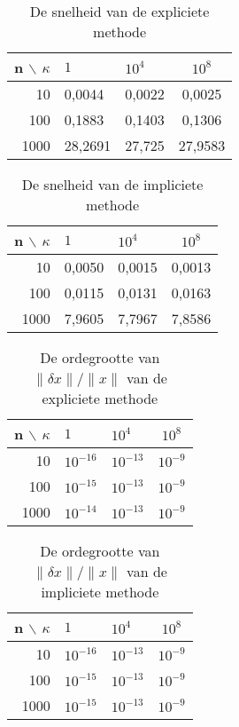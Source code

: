 \begin{table}[H]
\begin{center}
\begin{tabular}{r|llc}
n $\backslash$ $\kappa$ & $1$ & $10^4$ & $10^8$ \\\hline
10 & 0,0044 & 0,0022 & 0,0025 \\
100 & 0,1883 & 0,1403 & 0,1306 \\
1000 & 28,2691 & 27,725 & 27,9583
\end{tabular}
\end{center}
\caption{De snelheid van de expliciete methode}
\label{snelheid_exp}
\end{table}

\begin{table}[H]
\begin{center}
\begin{tabular}{r|llc}
n $\backslash$ $\kappa$ & $1$ & $10^4$ & $10^8$ \\\hline
10 & 0,0050 & 0,0015 & 0,0013 \\
100 & 0,0115 & 0,0131 & 0,0163 \\
1000 & 7,9605 & 7,7967 & 7,8586
\end{tabular}
\end{center}
\caption{De snelheid van de impliciete methode}
\label{snelheid_imp}
\end{table}

\begin{table}[H]
\begin{center}
\begin{tabular}{r|llc}
n $\backslash$ $\kappa$ & $1$ & $10^4$ & $10^8$ \\\hline
10 & $10^{-16}$ & $10^{-13}$ & $10^{-9}$ \\
100 & $10^{-15}$ & $10^{-13}$ & $10^{-9}$ \\
1000 & $10^{-14}$ & $10^{-13}$ & $10^{-9}$
\end{tabular}
\end{center}
\caption{De ordegrootte van $\lVert \delta x \rVert/\lVert x \rVert$ van de expliciete methode}
\label{dx_exp}
\end{table}

\begin{table}[H]
\begin{center}
\begin{tabular}{r|llc}
n $\backslash$ $\kappa$ & $1$ & $10^4$ & $10^8$ \\\hline
10 & $10^{-16}$ & $10^{-13}$ & $10^{-9}$ \\
100 & $10^{-15}$ & $10^{-13}$ & $10^{-9}$ \\
1000 & $10^{-15}$ & $10^{-13}$ & $10^{-9}$
\end{tabular}
\end{center}
\caption{De ordegrootte van $\lVert \delta x \rVert/\lVert x \rVert$ van de impliciete methode}
\label{dx_imp}
\end{table}


